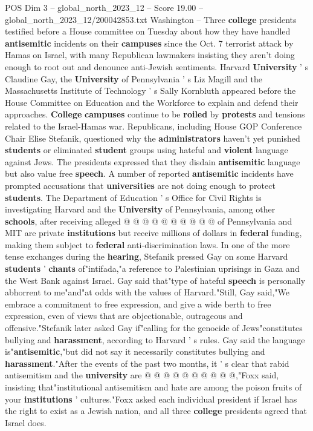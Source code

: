\begin{textsample}{POS Dim 3 – global\_north\_2023\_12 – Score 19.00 – global\_north\_2023\_12/200042853.txt}  \label{ex:f3_pos_218}
Washington -- Three \textbf{college} presidents testified before a House committee on Tuesday about how they have handled \textbf{antisemitic} incidents on their \textbf{campuses} since the Oct. 7 terrorist attack by Hamas on Israel, with many Republican lawmakers insisting they aren't doing enough to root out and denounce anti-Jewish sentiments.
Harvard \textbf{University} ' s Claudine Gay, the \textbf{University} of Pennsylvania ' s Liz Magill and the Massachusetts Institute of Technology ' s Sally Kornbluth appeared before the House Committee on Education and the Workforce to explain and defend their approaches. \textbf{College} \textbf{campuses} continue to be \textbf{roiled} by \textbf{protests} and tensions related to the Israel-Hamas war.
Republicans, including House GOP Conference Chair Elise Stefanik, questioned why the \textbf{administrators} haven't yet punished \textbf{students} or eliminated \textbf{student} groups using hateful and \textbf{violent} language against Jews.
The presidents expressed that they disdain \textbf{antisemitic} language but also value free \textbf{speech}.
A number of reported \textbf{antisemitic} incidents have prompted accusations that \textbf{universities} are not doing enough to protect \textbf{students}.
The Department of Education ' s Office for Civil Rights is investigating Harvard and the \textbf{University} of Pennsylvania, among other \textbf{schools}, after receiving alleged @ @ @ @ @ @ @ @ @ @ of Pennsylvania and MIT are private \textbf{institutions} but receive millions of dollars in \textbf{federal} funding, making them subject to \textbf{federal} anti-discrimination laws.
In one of the more tense exchanges during the \textbf{hearing}, Stefanik pressed Gay on some Harvard \textbf{students} ' \textbf{chants} of"intifada,"a reference to Palestinian uprisings in Gaza and the West Bank against Israel.
Gay said that"type of hateful \textbf{speech} is personally abhorrent to me"and"at odds with the values of Harvard."Still, Gay said,"We embrace a commitment to free expression, and give a wide berth to free expression, even of views that are objectionable, outrageous and offensive."Stefanik later asked Gay if"calling for the genocide of Jews"constitutes bullying and \textbf{harassment}, according to Harvard ' s rules.
Gay said the language is"\textbf{antisemitic},"but did not say it necessarily constitutes bullying and \textbf{harassment}."After the events of the past two months, it ' s clear that rabid antisemitism and the \textbf{university} are @ @ @ @ @ @ @ @ @ @,"Foxx said, insisting that"institutional antisemitism and hate are among the poison fruits of your \textbf{institutions} ' cultures."Foxx asked each individual president if Israel has the right to exist as a Jewish nation, and all three \textbf{college} presidents agreed that Israel does.

\end{textsample}
